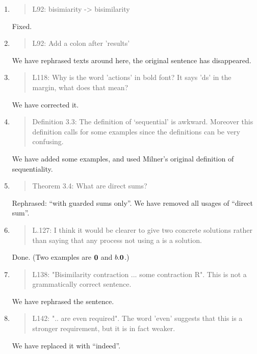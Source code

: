 \begin{enumerate}
\item \begin{quote}
    L92: bisimiarity -> bisimilarity
  \end{quote}
  \Mark
  Fixed.
  
\item \begin{quote}
    L92: Add a colon after 'results'
  \end{quote}
  \Mark
  We have rephrased texts around here, the original sentence has disappeared.
  
\item \begin{quote}
    L118: Why is the word 'actions' in bold font? It says 'ds' in the margin, what does that mean?
  \end{quote}
  \Mark
  We have corrected it. 
  
\item \begin{quote}
Definition 3.3: The definition of ‘sequential’ is awkward.  Moreover
this definition calls for some examples since the definitions can be
very confusing.
\end{quote}
  \Mark
 We have added some examples, and used Milner's original definition of sequentiality.
 
\item \begin{quote}
Theorem 3.4: What are direct sums?
\end{quote}
  \Mark
 Rephrased: ``with guarded sums only''. We have removed all usages of
``direct sum''.

\item \begin{quote}
    L.127: I think it would be clearer to give two concrete solutions
    rather than saying that any process not using a is a solution.
  \end{quote}
   \Mark
 Done. (Two examples are ${\boldsymbol 0}$ and $b.{\boldsymbol 0}$.)
  
\item \begin{quote}
    L138: "Bisimilarity contraction ... some contraction R". This is not a grammatically correct sentence.
  \end{quote}
  \Mark
  We have rephrased the sentence.
  
\item \begin{quote}
    L142: ".. are even required". The word 'even' suggests that this
    is a stronger requirement, but it is in fact weaker.
  \end{quote}
  \Mark
  We have replaced it with ``indeed''.
  

\end{enumerate}
